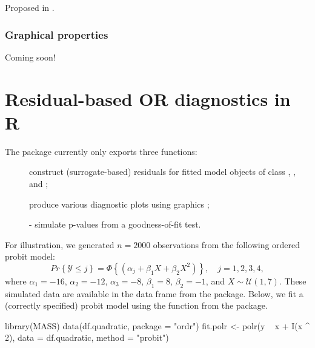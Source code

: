 Proposed in \citet{residuals-liu-2017}.


\subsubsection{Graphical properties}

Coming soon!



\section{Residual-based OR diagnostics in R}

The  package currently only exports three functions:
\begin{description}
  \item[] construct (surrogate-based) residuals for fitted model objects of class , , and ;
  \item[] produce various diagnostic plots using  graphics \citep{pkg-ggplot2};
 \item[] - simulate p-values from a goodness-of-fit test.
\end{description}

For illustration, we generated $n = 2000$ observations from the following ordered probit model:
\begin{equation}
\label{eqn:quadratic}
  Pr\left\{\mathcal{Y} \le j\right\} = \Phi\left\{\left(\alpha_j + \beta_1 X + \beta_2 X ^ 2\right)\right\}, \quad j = 1, 2, 3, 4,
\end{equation}
where $\alpha_1 = -16$, $\alpha_2 = -12$, $\alpha_3 = -8$, $\beta_1 = 8$, $\beta_2 = -1$, and $X \sim \mathcal{U}\left(1, 7\right)$. These simulated data are available in the  data frame from the  package. Below, we fit a (correctly specified) probit model using the  function from the  package.
\begin{example}
  library(MASS)
  data(df.quadratic, package = "ordr")
  fit.polr <- polr(y ~ x + I(x ^ 2), data = df.quadratic, method = "probit")
\end{example}


